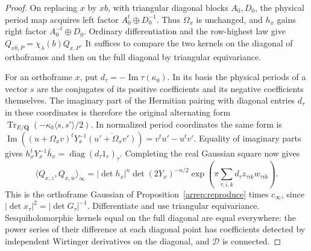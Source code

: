 \begin{proof}
On replacing $x$ by $xb$, with triangular diagonal blocks $A_0,D_0$,
the physical period map acquires left factor $A_0^t\oplus D_0^{-1}$.
Thus $\Omega_x$ is unchanged, and $h_x$ gains right factor
$A_0^{-t}\oplus D_0$. Ordinary differentiation and the row-highest
law give $Q_{xb,P}=\chi_\lambda(b)Q_{x,P}$. It suffices to compare
the two kernels on the diagonal of orthoframes and then on the full
diagonal by triangular equivariance.

For an orthoframe $x$, put $d_\tau=-\operatorname{Im}\tau(\kappa_0)$.
In its basis the physical periods of a vector $s$ are the conjugates
of its positive coefficients and its negative coefficients themselves.
The imaginary part of the Hermitian pairing with diagonal entries
$d_\tau$ in these coordinates is therefore the original alternating
form $\operatorname{Tr}_{E/\mathbf Q}(-\kappa_0\langle s,s'\rangle/2)$.
In normalized period coordinates the same form is
$\operatorname{Im}((u+\Omega_x v)^tY_x^{-1}
\overline{(u'+\Omega_x v')})=v^tu'-u^tv'$. Equality of imaginary
parts gives
$h_x^tY_x^{-1}\bar h_x=\operatorname{diag}(d_\tau 1_r)_\tau$.
Completing the real Gaussian square now gives
\[
 \langle Q_{x,z},Q_{x,\bar w}\rangle_\infty
 = |\det h_x|^n\det(2Y_x)^{-n/2}
          \exp\!\left(\pi\sum_{\tau,i,k} d_\tau z_{\tau ik}w_{\tau ik}\right).
\]
This is the orthoframe Gaussian of Proposition~\ref{arrep:reproduce}
times $c_\infty$, since $|\det x_\tau|^2=|\det G_\tau|^{-1}$.
Differentiate and use triangular equivariance. Sesquiholomorphic
kernels equal on the full diagonal are equal everywhere: the power
series of their difference at each diagonal point has coefficients
detected by independent Wirtinger derivatives on the diagonal,
and $\mathcal D$ is connected.
\end{proof}

